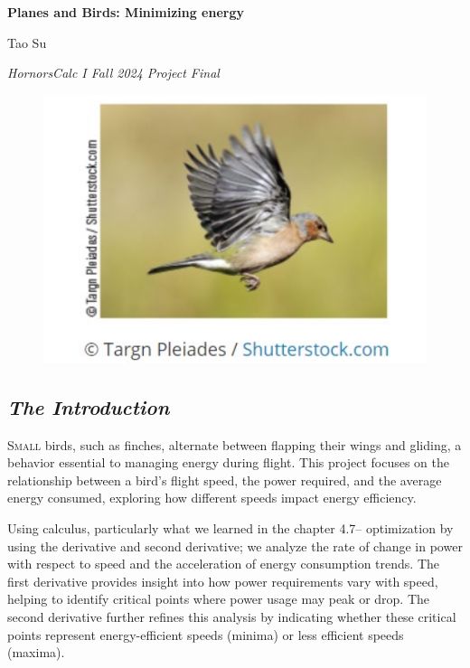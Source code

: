\documentclass{article}
\begin{document}
\begin{titlepage}
    \centering
    \vspace*{1cm}
    
    \Huge
    \textbf{Planes and Birds: Minimizing energy}
    
    \vspace{0.5cm}
    
    \Large
    Tao Su
    
    \vspace{1.5cm}
    
    \large 
    \textit{HornorsCalc I Fall 2024 Project Final}
    
    \vfill

    \begin{figure}[h]
        \centering
        \includegraphics[width=1\textwidth]{coverPage.png}
    \end{figure}
\end{titlepage}

\newpage

\subsection*{\itshape \large The Introduction}


\lettrine[lines=2]{S}{mall} birds, such as finches, alternate between flapping their wings and gliding, a behavior essential to managing energy during flight. This project focuses on the relationship between a bird’s flight speed, the power required, and the average energy consumed, exploring how different speeds impact energy efficiency.

Using calculus, particularly what we learned in the chapter 4.7-- optimization by using the derivative and second derivative; we analyze the rate of change in power with respect to speed and the acceleration of energy consumption trends. The first derivative provides insight into how power requirements vary with speed, helping to identify critical points where power usage may peak or drop. The second derivative further refines this analysis by indicating whether these critical points represent energy-efficient speeds (minima) or less efficient speeds (maxima).
\end{document}
